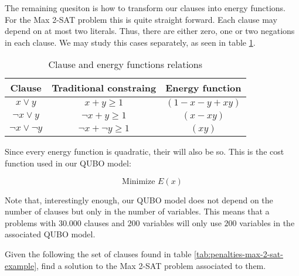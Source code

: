 The remaining quesiton is how to transform our clauses into energy functions. For the Max 2-SAT problem this is quite straight forward. Each clause may depend on at most two literals. Thus, there are either zero, one or two negations in each clause. We may study this cases separately, as seen in table \ref{tab:penalties-max-2-sat-table}.

\begin{table}[h]
	\centering
	\begin{tabular}{ccc}
		Clause 					& Traditional constraing	& Energy function		\\ \hline
		$x \vee y$       		& $x + y \geq 1$    		& $(1 - x - y + xy)$	\\
		$\neg x \vee y$      	& $\neg x + y \geq 1$ 		& $(x - xy) $  			\\		
		$\neg x \vee \neg y$    & $\neg x + \neg y \geq 1$ 	& $(xy)$ 
	\end{tabular}
	\caption{Clause and energy functions relations}
	\label{tab:penalties-max-2-sat-table}
\end{table}

Since every energy function is quadratic, their will also be so. This is the cost function used in our QUBO model:

$$ \text{Minimize } E(x) $$

Note that, interestingly enough, our QUBO model does not depend on the number of clauses but only in the number of variables. This means that a problems with $30.000$ clauses and $200$ variables will only use $200$ variables in the associated QUBO model.




Given the following the set of clauses found in table \ref{tab:penalties-max-2-sat-example}, find a solution to the Max 2-SAT problem associated to them.

